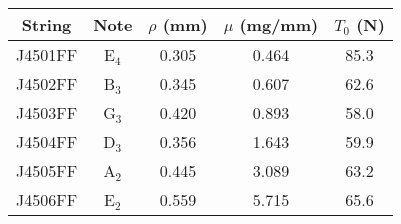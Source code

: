 \begin{tabular}{ccccc}
\toprule
String & Note & $\rho$ (mm) & $\mu$ (mg/mm) & $T_0$ (N) \\
\midrule
J4501FF & E$_{4}$ & 0.305 & 0.464 & 85.3 \\
J4502FF & B$_{3}$ & 0.345 & 0.607 & 62.6 \\
J4503FF & G$_{3}$ & 0.420 & 0.893 & 58.0 \\
J4504FF & D$_{3}$ & 0.356 & 1.643 & 59.9 \\
J4505FF & A$_{2}$ & 0.445 & 3.089 & 63.2 \\
J4506FF & E$_{2}$ & 0.559 & 5.715 & 65.6 \\
\bottomrule
\end{tabular}
